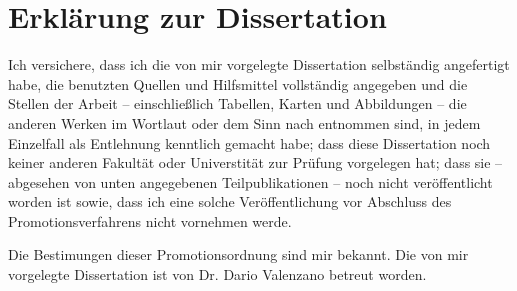 
\cleardoublepage
\setsinglecolumn
\chapter*{\centering \LARGE Erkl\"arung zur Dissertation}
\pagestyle{empty}
Ich versichere, dass ich die von mir vorgelegte Dissertation selbst\"andig angefertigt habe, die benutzten Quellen und Hilfsmittel vollst\"andig angegeben und die Stellen der Arbeit -- einschlie{\ss}lich Tabellen, Karten und Abbildungen -- die anderen Werken im Wortlaut oder dem Sinn nach entnommen sind, in jedem Einzelfall als Entlehnung kenntlich gemacht habe; dass diese Dissertation noch keiner anderen Fakult\"at oder Universtit\"at zur Pr\"ufung vorgelegen hat; dass sie -- abgesehen von unten angegebenen Teilpublikationen -- noch nicht ver\"offentlicht worden ist sowie, dass ich eine solche Ver\"offentlichung vor Abschluss des Promotionsverfahrens nicht vornehmen werde.

\noindent Die Bestimungen dieser Promotionsordnung sind mir bekannt. Die von mir vorgelegte Dissertation ist von Dr. Dario Valenzano betreut worden.

%

\declare{6em}